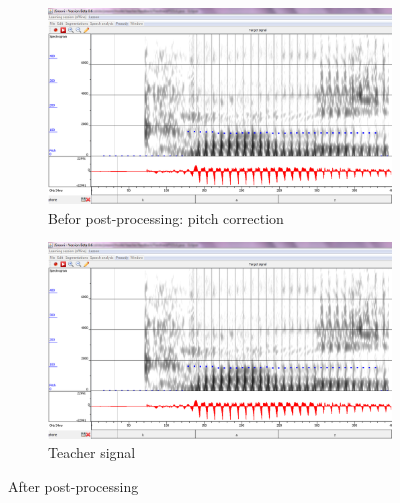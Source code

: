 \documentclass[11pt]{beamer}
\begin{document}
\begin{frame}
\begin{figure}
\begin{subfigure}{.5\textwidth}
  \centering
  \includegraphics[width=0.9\linewidth]{images/case_target.PNG}
  \caption{Befor post-processing: pitch correction }
  \label{fig:sfig1}
\end{subfigure}%
\begin{subfigure}{.5\textwidth}
  \centering
  \includegraphics[width=0.9\linewidth]{images/case_target.PNG}
  \caption{Teacher signal}
  \label{fig:sfig2}
\end{subfigure}
\caption{After post-processing}
\label{fig:fig}
\end{figure}
\end{frame}



	
	
	
\end{document}
